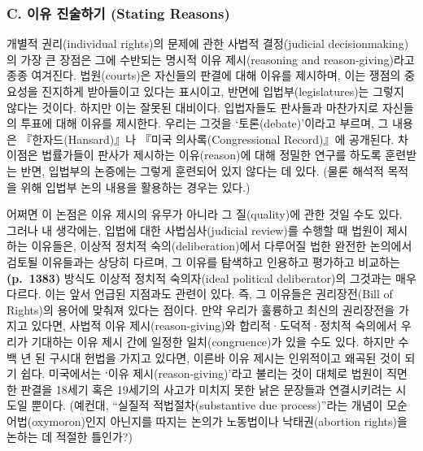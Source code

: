 \documentclass[a4paper,12pt,oneside]{article}  %
\begin{document}
\subsubsection{C. 이유 진술하기 (Stating
Reasons)}\label{c.-uxc774uxc720-uxc9c4uxc220uxd558uxae30-stating-reasons}

개별적 권리(individual rights)의 문제에 관한 사법적 결정(judicial
decisionmaking)의 가장 큰 장점은 그에 수반되는 명시적 이유
제시(reasoning and reason-giving)라고 종종 여겨진다. 법원(courts)은
자신들의 판결에 대해 이유를 제시하며, 이는 쟁점의 중요성을 진지하게
받아들이고 있다는 표시이고, 반면에 입법부(legislatures)는 그렇지 않다는
것이다. 하지만 이는 잘못된 대비이다. 입법자들도 판사들과 마찬가지로
자신들의 투표에 대해 이유를 제시한다. 우리는 그것을 `토론(debate)'이라고
부르며, 그 내용은 『한자드(Hansard)』나 『미국 의사록(Congressional
Record)』에 공개된다. 차이점은 법률가들이 판사가 제시하는 이유(reason)에
대해 정밀한 연구를 하도록 훈련받는 반면, 입법부의 논증에는 그렇게
훈련되어 있지 않다는 데 있다. (물론 해석적 목적을 위해 입법부 논의
내용을 활용하는 경우는 있다.)

어쩌면 이 논점은 이유 제시의 유무가 아니라 그 질(quality)에 관한 것일
수도 있다. 그러나 내 생각에는, 입법에 대한 사법심사(judicial review)를
수행할 때 법원이 제시하는 이유들은, 이상적 정치적 숙의(deliberation)에서
다루어질 법한 완전한 논의에서 검토될 이유들과는 상당히 다르며, 그 이유를
탐색하고 인용하고 평가하고 비교하는 \textbf{(p.~1383)} 방식도 이상적
정치적 숙의자(ideal political deliberator)의 그것과는 매우 다르다. 이는
앞서 언급된 지점과도 관련이 있다. 즉, 그 이유들은 권리장전(Bill of
Rights)의 용어에 맞춰져 있다는 점이다. 만약 우리가 훌륭하고 최신의
권리장전을 가지고 있다면, 사법적 이유 제시(reason-giving)와
합리적·도덕적·정치적 숙의에서 우리가 기대하는 이유 제시 간에 일정한
일치(congruence)가 있을 수도 있다. 하지만 수백 년 된 구시대 헌법을
가지고 있다면, 이른바 이유 제시는 인위적이고 왜곡된 것이 되기 쉽다.
미국에서는 `이유 제시(reason-giving)'라고 불리는 것이 대체로 법원이
직면한 판결을 18세기 혹은 19세기의 사고가 미치지 못한 낡은 문장들과
연결시키려는 시도일 뿐이다. (예컨대, ``실질적 적법절차(substantive due
process)''라는 개념이 모순어법(oxymoron)인지 아닌지를 따지는 논의가
노동법이나 낙태권(abortion rights)을 논하는 데 적절한 틀인가?)
\end{document}
